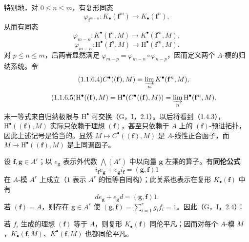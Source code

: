 特别地，对 $0\leq n\leq m$，有复形同态
\begin{equation}\tag{1.1.6.1}
\varphi_{\mathbf f^{m-n}}:K_\bullet(\mathbf f^m)\to K_\bullet(\mathbf f^n),
\end{equation}
从而有同态
\begin{equation}\tag{1.1.6.2}
\varphi_{m-n}:K^\bullet(\mathbf f^n,M)\to K^\bullet(\mathbf f^m,M),
\end{equation}
\begin{equation}\tag{1.1.6.3}
\varphi_{m-n}:\mathrm H^\bullet(\mathbf f^n,M)\to\mathrm H^\bullet(\mathbf f^m,M).
\end{equation}
对 $p\leq n\leq m$，后两者显然满足 $\varphi_{m-p}=\varphi_{m-n}\circ\varphi_{n-p}$，因而定义两个 $A$-模的归纳系统。令
\begin{equation}\tag{1.1.6.4}
C^\bullet((\mathbf f),M)=\varinjlim_nK^\bullet(\mathbf f^n,M),
\end{equation}
\begin{equation}\tag{1.1.6.5}
\mathrm H^\bullet((\mathbf f),M)=\mathrm H^\bullet(C^\bullet((\mathbf f),M))
=\varinjlim_n\mathrm H^\bullet(\mathbf f^n,M).
\end{equation}
末一等式来自归纳极限与 $\mathrm H^\bullet$ 可交换（G，I，2.1）。以后将看到（1.4.3），$\mathrm H^\bullet((\mathbf f),M)$ 实际只依赖于理想 $(\mathbf f)$，甚至只依赖于 $A$ 上的 $(\mathbf f)$-预进拓扑，因此上述记号是恰当的。显然 $M\mapsto C^\bullet((\mathbf f),M)$ 是 $A$-线性正合函子，而 $M\mapsto\mathrm H^\bullet((\mathbf f),M)$ 是上同调函子。

设 $\mathbf f,\mathbf g\in A^r$；以 $e_{\mathbf g}$ 表示外代数 $\bigwedge(A^r)$ 中以向量 $\mathbf g$ 左乘的算子。有\textbf{同伦公式}
\begin{equation}\tag{1.1.7.1}
i_{\mathbf f}e_{\mathbf g}+e_{\mathbf g}i_{\mathbf f}=(\mathbf g,\mathbf f)1
\end{equation}
在 $A$-模 $A^r$ 上成立（$1$ 表示 $A^r$ 的恒等自同构）；此关系也表示在复形 $K_\bullet(\mathbf f)$ 中有
\begin{equation}\tag{1.1.7.2}
de_{\mathbf g}+e_{\mathbf g}d=(\mathbf g,\mathbf f)1.
\end{equation}
若 $(\mathbf f)=A$，则存在 $\mathbf g\in A^r$ 使 $(\mathbf g,\mathbf f)=\sum_{i=1}^rg_if_i=1$。因此（G，I，2.4）：

若 $f_i$ 生成的理想 $(\mathbf f)$ 等于 $A$，则复形 $K_\bullet(\mathbf f)$ 同伦平凡；因而对每个 $A$-模 $M$，$K_\bullet(\mathbf f,M)$、$K^\bullet(\mathbf f,M)$ 也都同伦平凡。

